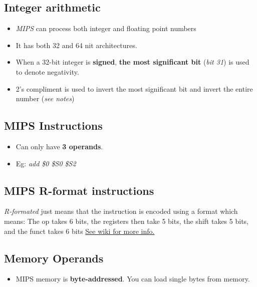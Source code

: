 \documentclass[12pt]{article}
\begin{document}
\subsection*{Integer arithmetic}
\begin{itemize}
    \item \textit{MIPS} can process both integer and floating point numbers
    \item It has both 32 and 64 nit architectures.
    \item When a 32-bit integer is \textbf{signed}, \textbf{the most significant bit} (\textit{bit 31}) is used to denote negativity.
    \item 2's compliment is used to invert the most significant bit and invert the entire number (\textit{see notes})
\end{itemize}

\subsection*{MIPS Instructions}
\begin{itemize}
    \item Can only have \textbf{3 operands}.
    \item Eg: \textit{add \$0 \$S0 \$S2}
\end{itemize}

\subsection*{MIPS R-format instructions}
\textit{R-formated} just means that the instruction is encoded using a format which means:
\newline
The op takes 6 bits, the registers then take 5 bits, the shift takes 5 bits, and the funct takes 6 bits
\newline
\newline
\href{https://en.wikibooks.org/wiki/MIPS_Assembly/Instruction_Formats}{See wiki for more info.}

\subsection*{Memory Operands}
\begin{itemize}
    \item MIPS memory is \textbf{byte-addressed}. You can load single bytes from memory.
\end{itemize}
\end{document}
